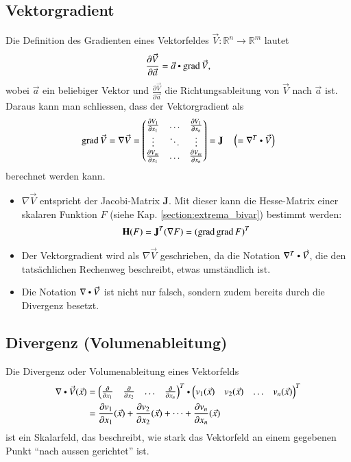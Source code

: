 \subsection{Vektorgradient}
Die Definition des Gradienten eines Vektorfeldes $\vec{V}: \mathbb{R}^n \to \mathbb{R}^m$ lautet
\[ \frac{\partial \vec{V}}{\partial \vec{a}} = \vec{a} \dotp \grad \vec{V}, \]
wobei $\vec{a}$ ein beliebiger Vektor und $\frac{\partial \vec{V}}{\partial \vec{a}}$ die Richtungsableitung von $\vec{V}$ nach $\vec{a}$ ist.
Daraus kann man schliessen, dass der Vektorgradient als
\[ 
    \grad \vec{V} 
    = \nabla \vec{V}
    = \begin{pmatrix}
        \frac{\partial V_1}{\partial x_1} & \hdots & \frac{\partial V_1}{\partial x_n} \\
        \vdots & \ddots & \vdots \\
        \frac{\partial V_m}{\partial x_1} & \hdots & \frac{\partial V_m}{\partial x_n} \\
    \end{pmatrix} 
    = \mathbf{J}
    \hspace{1em} \left(= \nabla^T \dotp \vec{V}\right)
\]
berechnet werden kann.
\begin{itemize}
    \item $\nabla \vec{V}$ entspricht der Jacobi-Matrix $\mathbf{J}$. 
          Mit dieser kann die Hesse-Matrix einer skalaren Funktion $F$ (siehe Kap. \ref{section:extrema_bivar}) bestimmt werden: \[ \mathbf{H}(F) = \mathbf{J}^T(\nabla F) = (\operatorname{grad} \operatorname{grad} F)^T \]
    \item Der Vektorgradient wird als $\nabla \vec{V}$ geschrieben, da die Notation $\nabla^T \dotp \vec{V}$, die den tatsächlichen Rechenweg beschreibt, etwas umständlich ist.
    \item Die Notation $\nabla \dotp \vec{V}$ ist nicht nur falsch, sondern zudem bereits durch die Divergenz besetzt.
\end{itemize}

\subsection{Divergenz (Volumenableitung)}
Die Divergenz oder Volumenableitung eines Vektorfelds
\[
\begin{aligned}
    \nabla \dotp \vec{V}(\vec{x})
    &= \begin{pmatrix} \frac{\partial}{\partial x_1} & \frac{\partial}{\partial x_2} & \dots & \frac{\partial}{\partial x_n} \end{pmatrix}^T \dotp \begin{pmatrix} v_1(\vec{x}) & v_2(\vec{x}) & \dots & v_n(\vec{x}) \end{pmatrix}^T \\
    &= \frac{\partial v_1}{\partial x_1}(\vec{x}) + \frac{\partial v_2}{\partial x_2}(\vec{x}) + \dots + \frac{\partial v_n}{\partial x_n}(\vec{x})
\end{aligned}
\]
ist ein Skalarfeld, das beschreibt, wie stark das Vektorfeld an einem gegebenen Punkt ``nach aussen gerichtet'' ist. 

